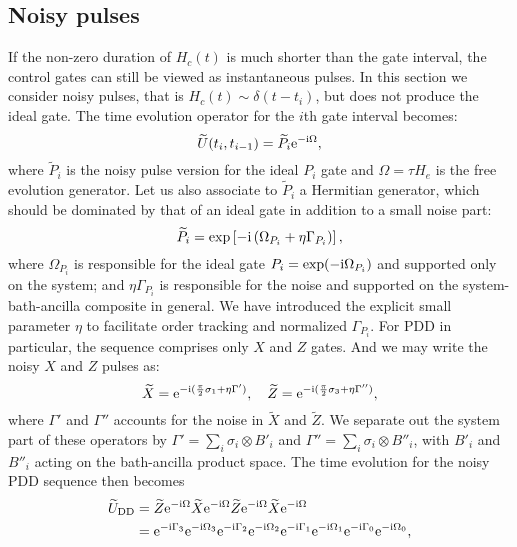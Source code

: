 \documentclass[b5paper,11pt]{article}
\newcommand{\wtP}{\widetilde{P}}
\newcommand{\wtU}{\widetilde{U}}
\newcommand{\wt}[1]{\widetilde{#1}}
\newcommand{\rDD}{\mathrm{DD}}
\begin{document}
\subsection{Noisy pulses}
If the non-zero duration of $H_c(t)$ is much shorter than the gate interval,  the control gates can still be viewed as instantaneous pulses. In this section we consider noisy pulses, that is 
$H_c(t)\sim \delta(t-t_i)$, but does not produce the ideal gate.
The  time evolution operator for the $i$th gate interval becomes:
\begin{equation}\label{eq:npulses-Ui}
 \wtU(t_i,t_{i-1}) = \wtP_i \upe^{-\upi \Omega},
\end{equation}
where $\widetilde{P}_i$ is the noisy pulse version for the ideal $P_i$ gate and $\Omega=\tau H_e$ is the free evolution generator.
Let us also associate to $\wtP_i$ a Hermitian generator, which should be dominated by that of an ideal gate in addition to a small noise part:
\begin{equation}\label{eq:npulses-Pi}
 \widetilde{P}_i= \exp\left[ -\mathrm{i} \left( \Omega_{P_i} +  \eta \Gamma_{P_i} \right)  \right],
\end{equation}
where $\Omega_{P_i}$ is responsible for the ideal gate $P_i = \exp(-\mathrm{i} \Omega_{P_i})$ and supported only on the system; and $ \eta \Gamma_{P_i} $ is responsible for the noise and supported on the system-bath-ancilla composite in general. We have introduced the explicit small parameter $\eta$ to facilitate order tracking and normalized $\Gamma_{P_i}$. For PDD in particular, the sequence comprises only $X$ and $Z$ gates. 
And we may write the noisy $X$ and $Z$ pulses as:
\begin{equation}
\widetilde{X} = \mathrm{e}^{-\mathrm{i} ( \frac{\pi}{2} \sigma_1 + \eta\Gamma')},\quad
 \widetilde{Z} = \mathrm{e}^{-\mathrm{i} ( \frac{\pi}{2} \sigma_3 + \eta\Gamma'')},
\end{equation}
where $\Gamma'$ and $\Gamma''$ accounts for the noise in $\wt X$ and $\wt Z$.
We separate out the system part of these operators by $\Gamma' = \sum_i \sigma_i \otimes B'_i $ and $\Gamma''=\sum_i \sigma_i \otimes B''_i$, with $B'_i$ and $B''_i$ acting on the bath-ancilla product space. 
The time evolution for the noisy PDD sequence then becomes
\begin{equation}\label{eq:UPDD-gatedep}
 \begin{aligned}
\wtU_\rDD &=
 \widetilde{Z} \upe^{-\upi \Omega}
 \widetilde{X} \upe^{-\upi \Omega}
 \widetilde{Z} \upe^{-\upi \Omega}
 \widetilde{X} \upe^{-\upi \Omega}\\
 & = \upe^{-\upi  \Gamma_3} \upe^{- \upi\Omega_3}
 \upe^{-\upi  \Gamma_2}  \upe^{-\upi\Omega_2}
\upe^{-\upi  \Gamma_1} \upe^{-\upi\Omega_1}
\upe^{-\upi  \Gamma_0}  \upe^{-\upi \Omega_0},
\end{aligned}
\end{equation}
\end{document}

